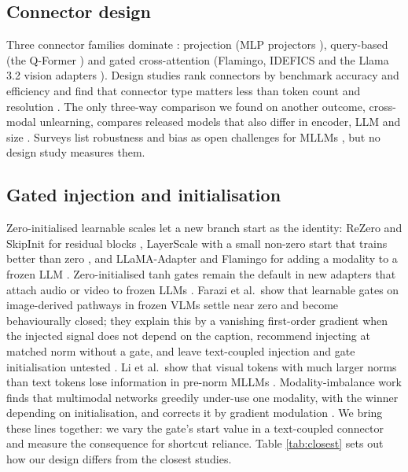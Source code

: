 \subsection{Connector design}

Three connector families dominate \citep{yin2024mllmsurvey,huang2025vitsurvey}: projection (MLP projectors
\citep{liu2024llava15}), query-based (the Q-Former \citep{li2023blip2}) and gated cross-attention (Flamingo, IDEFICS and the
Llama 3.2 vision adapters \citep{alayrac2022flamingo,laurencon2023obelics,grattafiori2024llama3}). Design studies rank
connectors by benchmark accuracy and efficiency \citep{mckinzie2024mm1,cha2024honeybee,karamcheti2024prismatic,tong2024cambrian} and find that connector type matters less than token count and resolution \citep{mckinzie2024mm1}. The only
three-way comparison we found on another outcome, cross-modal unlearning, compares released models that also differ
in encoder, LLM and size \citep{balaji2026forget}. Surveys list robustness and bias as open challenges for MLLMs
\citep{awais2025foundation,zhang2024vlmsurvey}, but no design study measures them.

\subsection{Gated injection and initialisation}

Zero-initialised learnable scales let a new branch start as the identity: ReZero and SkipInit for residual blocks
\citep{bachlechner2021rezero,de2020skipinit}, LayerScale with a small non-zero start that trains better than zero
\citep{touvron2021cait}, and LLaMA-Adapter and Flamingo for adding a modality to a frozen LLM \citep{zhang2024llamaadapter,alayrac2022flamingo}. Zero-initialised tanh gates remain the default in new adapters that attach audio or video to
frozen LLMs \citep{rm2026zerogated}. Farazi et al.~show that learnable gates on image-derived pathways in frozen VLMs settle near
zero and become behaviourally closed; they explain this by a vanishing first-order gradient when the injected signal
does not depend on the caption, recommend injecting at matched norm without a gate, and leave text-coupled injection
and gate initialisation untested \citep{farazi2026gate}. Li et al.~show that visual tokens with much larger norms than
text tokens lose information in pre-norm MLLMs \citep{li2025unseen}. Modality-imbalance work finds that multimodal
networks greedily under-use one modality, with the winner depending on initialisation, and corrects it by gradient
modulation \citep{wu2022greedy,huang2022modality,peng2022balanced}. We bring these lines together: we vary the gate's
start value in a text-coupled connector and measure the consequence for shortcut reliance. Table \ref{tab:closest} sets out how our
design differs from the closest studies.


